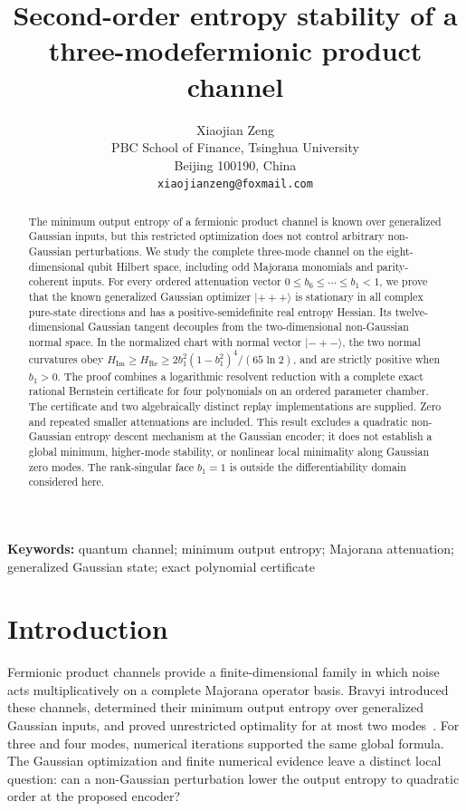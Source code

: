 \documentclass[11pt,a4paper]{article}
\title{Second-order entropy stability of a three-mode\break fermionic product channel}
\author{Xiaojian Zeng\\[2pt]
\small PBC School of Finance, Tsinghua University\\
\small Beijing 100190, China\\
\small \texttt{xiaojianzeng@foxmail.com}}
\date{}
\newcommand{\ket}[1]{\lvert #1\rangle}
\newcommand{\Ree}{\operatorname{Re}}
\newcommand{\Imm}{\operatorname{Im}}
\begin{document}
\maketitle
\begin{abstract}
The minimum output entropy of a fermionic product channel is known over
generalized Gaussian inputs, but this restricted optimization does not control
arbitrary non-Gaussian perturbations. We study the complete three-mode channel
on the eight-dimensional qubit Hilbert space, including odd Majorana monomials
and parity-coherent inputs. For every ordered attenuation vector
$0\le b_6\le\cdots\le b_1<1$, we prove that the known generalized Gaussian
optimizer $\ket{+++}$ is stationary in all complex pure-state directions and
has a positive-semidefinite real entropy Hessian. Its twelve-dimensional
Gaussian tangent decouples from the two-dimensional non-Gaussian normal
space. In the normalized chart with normal vector $\ket{-+-}$, the two
normal curvatures obey
$H_{\Imm}\ge H_{\Ree}\ge 2b_1^2(1-b_1^2)^4/(65\ln 2)$,
and are strictly positive when $b_1>0$. The proof combines a logarithmic
resolvent reduction with a complete exact rational Bernstein certificate
for four polynomials on an ordered parameter chamber. The certificate and
two algebraically distinct replay implementations are supplied. Zero and
repeated smaller attenuations are included. This result excludes a quadratic
non-Gaussian entropy descent mechanism at the Gaussian encoder; it does not
establish a global minimum, higher-mode stability, or nonlinear local
minimality along Gaussian zero modes. The rank-singular face $b_1=1$ is
outside the differentiability domain considered here.
\end{abstract}
\noindent\textbf{Keywords:} quantum channel; minimum output entropy; Majorana
attenuation; generalized Gaussian state; exact polynomial certificate

\section{Introduction}
Fermionic product channels provide a finite-dimensional family in which
noise acts multiplicatively on a complete Majorana operator basis.
Bravyi introduced these channels, determined their minimum output entropy
over generalized Gaussian inputs, and proved unrestricted optimality for
at most two modes~\cite{Bravyi2005}. For three and four modes, numerical
iterations supported the same global formula. The Gaussian optimization
and finite numerical evidence leave a distinct local question: can a
non-Gaussian perturbation lower the output entropy to quadratic order at
the proposed encoder?
\end{document}
